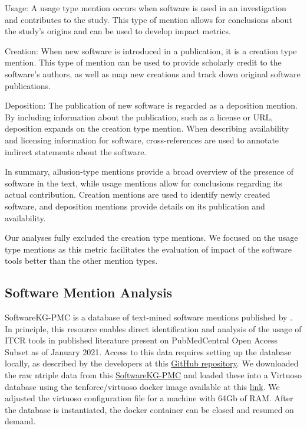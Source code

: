 \documentclass{article}
\begin{document}
Usage: A usage type mention occurs when software is used in an investigation and contributes to the study. This type of mention allows for conclusions about the study's origins and can be used to develop impact metrics. 
 
Creation: When new software is introduced in a publication, it is a creation type mention. This type of mention can be used to provide scholarly credit to the software's authors, as well as map new creations and track down original software publications.
 
Deposition: The publication of new software is regarded as a deposition mention. By including information about the publication, such as a license or URL, deposition expands on the creation type mention. When describing availability and licensing information for software, cross-references are used to annotate indirect statements about the software.
 
In summary, allusion-type mentions provide a broad overview of the presence of software in the text, while usage mentions allow for conclusions regarding its actual contribution. Creation mentions are used to identify newly created software, and deposition mentions provide details on its publication and availability.

Our analyses fully excluded the creation type mentions. We focused on the usage type mentions as this metric facilitates the evaluation of impact of the software tools better than the other mention types. 


\subsection{Software Mention Analysis}


SoftwareKG-PMC is a database of text-mined software mentions published by \cite{Kruger_usage_20}. In principle, this resource enables direct identification and analysis of the usage of ITCR tools in published literature present on PubMedCentral Open Access Subset as of January 2021. Access to this data requires setting up the database locally, as described by the developers at this \href{https://urldefense.com/v3/__https://github.com/f-krueger/SoftwareKG-PMC-Analysis__;!!GuAItXPztq0!hBzPcpXZ3SCNtkVgVI9KgwxhTOgm6JY1gKzCzCFfer1uhtTUx-sWnQyzKdfDCT0yogPVN8-gs4KZy97R-JH4PN6VNw20GNQ$}{GitHub repository}. We downloaded the raw ntriple data from this \href{https://urldefense.com/v3/__https://zenodo.org/record/7400022__;!!GuAItXPztq0!hBzPcpXZ3SCNtkVgVI9KgwxhTOgm6JY1gKzCzCFfer1uhtTUx-sWnQyzKdfDCT0yogPVN8-gs4KZy97R-JH4PN6VRftmtmY$}{SoftwareKG-PMC} and loaded these into a Virtuoso database using the tenforce/virtuoso docker image available at this \href{https://urldefense.com/v3/__https://hub.docker.com/r/tenforce/virtuoso/__;!!GuAItXPztq0!hBzPcpXZ3SCNtkVgVI9KgwxhTOgm6JY1gKzCzCFfer1uhtTUx-sWnQyzKdfDCT0yogPVN8-gs4KZy97R-JH4PN6V0PP1Kqo$}{link}. We adjusted the virtuoso configuration file for a machine with 64Gb of RAM. After the database is instantiated, the docker container can be closed and resumed on demand.
\end{document}
